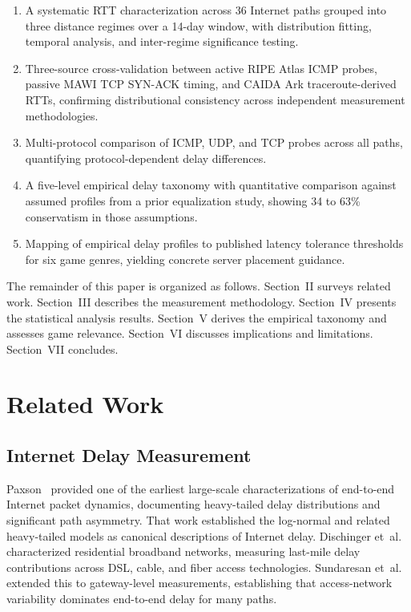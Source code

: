 \documentclass[conference]{IEEEtran}
\begin{document}
\begin{enumerate}
\item A systematic RTT characterization across 36 Internet paths grouped into three distance regimes over a 14-day window, with distribution fitting, temporal analysis, and inter-regime significance testing.
\item Three-source cross-validation between active RIPE Atlas ICMP probes, passive MAWI TCP SYN-ACK timing, and CAIDA Ark traceroute-derived RTTs, confirming distributional consistency across independent measurement methodologies.
\item Multi-protocol comparison of ICMP, UDP, and TCP probes across all paths, quantifying protocol-dependent delay differences.
\item A five-level empirical delay taxonomy with quantitative comparison against assumed profiles from a prior equalization study, showing 34 to 63\% conservatism in those assumptions.
\item Mapping of empirical delay profiles to published latency tolerance thresholds for six game genres, yielding concrete server placement guidance.
\end{enumerate}

The remainder of this paper is organized as follows. Section~II surveys related work. Section~III describes the measurement methodology. Section~IV presents the statistical analysis results. Section~V derives the empirical taxonomy and assesses game relevance. Section~VI discusses implications and limitations. Section~VII concludes.

\section{Related Work}

\subsection{Internet Delay Measurement}

Paxson~\cite{paxson1999} provided one of the earliest large-scale characterizations of end-to-end Internet packet dynamics, documenting heavy-tailed delay distributions and significant path asymmetry. That work established the log-normal and related heavy-tailed models as canonical descriptions of Internet delay. Dischinger et~al.~\cite{dischinger2007} characterized residential broadband networks, measuring last-mile delay contributions across DSL, cable, and fiber access technologies. Sundaresan et~al.~\cite{sundaresan2011} extended this to gateway-level measurements, establishing that access-network variability dominates end-to-end delay for many paths.
\end{document}
